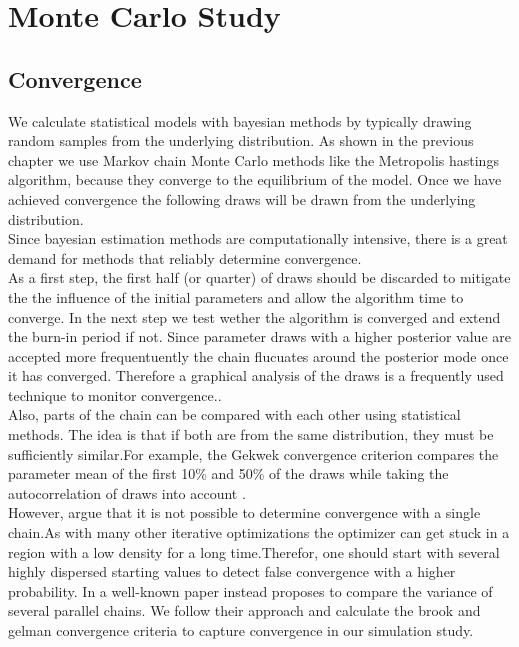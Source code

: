\section{Monte Carlo Study}

\subsection{Convergence}

We calculate statistical models with bayesian methods by typically drawing random samples from the underlying distribution. As shown in the previous chapter we use Markov chain Monte Carlo methods like the Metropolis hastings algorithm, because they converge to the equilibrium of the model. Once we have achieved convergence the following draws will be drawn from the underlying distribution. \\
Since bayesian estimation methods are computationally intensive, there is a great demand for methods that reliably determine convergence.\\
As a first step, the first half (or quarter) of draws should be discarded to mitigate the the influence of the initial parameters and allow the algorithm time to converge. In the next step we test wether the algorithm is converged and extend the burn-in period if not.
Since parameter draws with a higher posterior value are accepted more frequentuently the chain flucuates around the posterior mode once it has converged. Therefore a graphical analysis of the draws is a frequently used technique to monitor convergence..\\
Also, parts of the chain can be compared with each other using statistical methods. The idea is that if both are from the same distribution, they must be sufficiently similar.For example, the Gekwek convergence criterion compares the parameter mean of the first 10\% and 50\% of the draws while taking the autocorrelation of draws into account \cite{geweke1992}.\\
However, \cite{brooks1998} argue that it is not possible to determine convergence with a single chain.As with many other iterative optimizations the optimizer can get stuck in a region with a low density for a long time.Therefor, one should start with several highly dispersed starting values to detect false convergence with a higher probability. In a well-known paper \cite{gelman1992} instead proposes to compare the variance of several parallel chains.
We follow their approach and calculate the brook and gelman convergence criteria to capture convergence in our simulation study.\\
